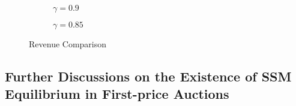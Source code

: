 \begin{figure}[ht]
    \centering
    \begin{subfigure}[b]{0.8\textwidth}
        \centering
        \resizebox{\textwidth}{!}{%
        }
        \caption{ \(\gamma=0.9\)}
     
    \end{subfigure}
 
    \begin{subfigure}[b]{0.8\textwidth}
        \centering
        \resizebox{\textwidth}{!}{%
        }
        \caption{\(\gamma=0.85\)}
       
    \end{subfigure}
    \caption{Revenue Comparison}
    \label{fig:rev_comparison_general_gamma}
\end{figure}




\subsection{Further Discussions on the Existence of SSM Equilibrium in First-price Auctions}
\label{app_subsec:condition_firstprice_SSM}


